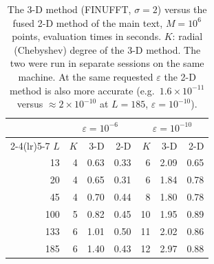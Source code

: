 \begin{table}[!htbp]\centering\small
\caption{The 3-D method (FINUFFT, $\sigma=2$) versus the fused 2-D method of the main text, $M=10^6$ points, evaluation times in seconds.
$K$: radial (Chebyshev) degree of the 3-D method. The two were run in separate sessions on the same machine. At the same requested $\varepsilon$
the 2-D method is also more accurate (e.g.\ $1.6\times10^{-11}$ versus $\approx2\times10^{-10}$ at $L=185$, $\varepsilon=10^{-10}$).}\label{tab:3d}
\begin{tabular}{r rrr rrr}\toprule
&\multicolumn{3}{c}{$\varepsilon=10^{-6}$}&\multicolumn{3}{c}{$\varepsilon=10^{-10}$}\\
\cmidrule(lr){2-4}\cmidrule(lr){5-7}
$L$&$K$&3-D&2-D&$K$&3-D&2-D\\\midrule
13 & 4 & 0.63 & 0.33 & 6 & 2.09 & 0.65\\
20 & 4 & 0.65 & 0.31 & 6 & 1.84 & 0.78\\
45 & 4 & 0.70 & 0.44 & 8 & 1.80 & 0.78\\
100 & 5 & 0.82 & 0.45 & 10 & 1.95 & 0.89\\
133 & 6 & 1.01 & 0.50 & 11 & 2.02 & 0.86\\
185 & 6 & 1.40 & 0.43 & 12 & 2.97 & 0.88\\
\bottomrule\end{tabular}\end{table}
